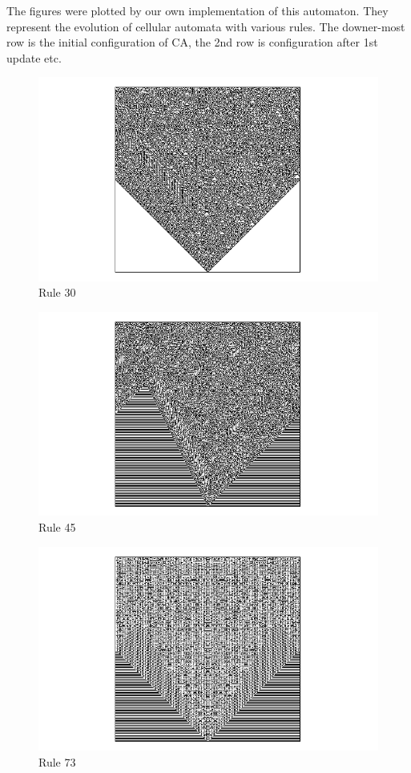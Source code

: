 The figures were plotted by our own implementation of this automaton.
They represent the evolution of cellular automata with various rules.
The downer-most row is the initial configuration of CA, 
the 2nd row is configuration after 1st update etc.

\begin{figure}[!t]
 \centering
 \includegraphics[trim = 40mm 0mm 0mm 0mm, width=1.7\textwidth]{./img/30_500}
 \caption{Rule 30}
 \label{rule30}
\end{figure}

\begin{figure}[!b]
 \centering
 \includegraphics[trim = 40mm 0mm 0mm 0mm, width=1.7\textwidth]{./img/45_500}
 \caption{Rule 45}
\end{figure}

\begin{figure}
 \centering
 \includegraphics[trim = 40mm 0mm 0mm 0mm, width=1.7\textwidth]{./img/73_500}
 \caption{Rule 73}
\end{figure}


